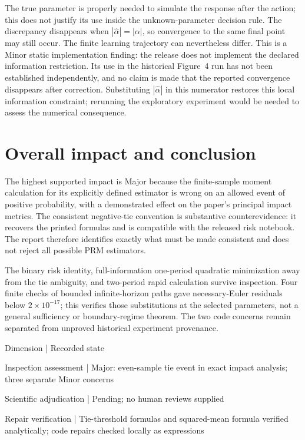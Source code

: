 \documentclass[10pt]{article}
\begin{document}
The true parameter is properly needed to simulate the response after the action; this does not justify its use inside the unknown-parameter decision rule. The discrepancy disappears when \(|\widehat\alpha|=|\alpha|\), so convergence to the same final point may still occur. The finite learning trajectory can nevertheless differ. This is a Minor static implementation finding: the release does not implement the declared information restriction. Its use in the historical Figure 4 run has not been established independently, and no claim is made that the reported convergence disappears after correction. Substituting \(|\widehat\alpha|\) in this numerator restores this local information constraint; rerunning the exploratory experiment would be needed to assess the numerical consequence.\par
\section*{Overall impact and conclusion}
The highest supported impact is Major because the finite-sample moment calculation for its explicitly defined estimator is wrong on an allowed event of positive probability, with a demonstrated effect on the paper’s principal impact metrics. The consistent negative-tie convention is substantive counterevidence: it recovers the printed formulas and is compatible with the released risk notebook. The report therefore identifies exactly what must be made consistent and does not reject all possible PRM estimators.\par
The binary risk identity, full-information one-period quadratic minimization away from the tie ambiguity, and two-period rapid calculation survive inspection. Four finite checks of bounded infinite-horizon paths gave necessary-Euler residuals below \(2\times10^{-17}\); this verifies those substitutions at the selected parameters, not a general sufficiency or boundary-regime theorem. The two code concerns remain separated from unproved historical experiment provenance.\par
Dimension | Recorded state\par
Inspection assessment | Major: even-sample tie event in exact impact analysis; three separate Minor concerns\par
Scientific adjudication | Pending; no human reviews supplied\par
Repair verification | Tie-threshold formulas and squared-mean formula verified analytically; code repairs checked locally as expressions\par
\end{document}
